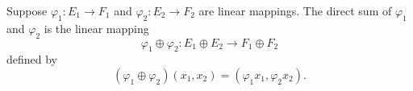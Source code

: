 Suppose $\varphi_1: E_1 \to F_1$ and $\varphi_2: E_2 \to F_2$ are linear mappings. The direct sum of $\varphi_1$ and $\varphi_2$ is the linear mapping
$$\varphi_1 \oplus \varphi_2: E_1 \oplus E_2 \to F_1 \oplus F_2$$
defined by
$$(\varphi_1 \oplus \varphi_2)(x_1, x_2) = (\varphi_1 x_1, \varphi_2 x_2).$$
